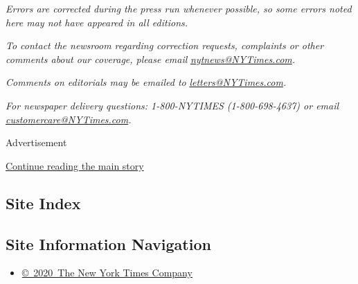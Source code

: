 \emph{Errors are corrected during the press run whenever possible, so
some errors noted here may not have appeared in all editions.}

\emph{To contact the newsroom regarding correction requests, complaints
or other comments about our coverage, please email}
\href{mailto:nytnews@NYTimes.com}{\emph{nytnews@NYTimes.com}}\emph{.}

\emph{Comments on editorials may be emailed to}
\href{mailto:letters@NYTimes.com}{\emph{letters@NYTimes.com}}\emph{.}

\emph{For newspaper delivery questions: 1-800-NYTIMES (1-800-698-4637)
or email}
\href{mailto:customercare@NYTimes.com}{\emph{customercare@NYTimes.com}}\emph{.}

Advertisement

\protect\hyperlink{after-bottom}{Continue reading the main story}

\hypertarget{site-index}{%
\subsection{Site Index}\label{site-index}}

\hypertarget{site-information-navigation}{%
\subsection{Site Information
Navigation}\label{site-information-navigation}}

\begin{itemize}
\tightlist
\item
  \href{https://help.nytimes3xbfgragh.onion/hc/en-us/articles/115014792127-Copyright-notice}{©~2020~The
  New York Times Company}
\end{itemize}


